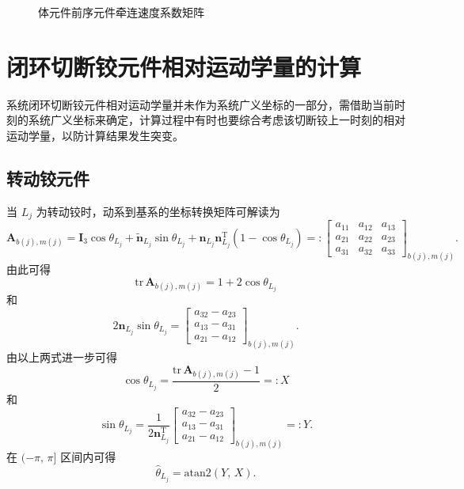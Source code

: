 \begin{figure}[htbp]
  \centering
  \caption{体元件前序元件牵连速度系数矩阵}
  \label{fig:10.6}
\end{figure}

\section{闭环切断铰元件相对运动学量的计算}

系统闭环切断铰元件相对运动学量并未作为系统广义坐标的一部分，需借助当前时刻的系统广义坐标来确定，计算过程中有时也要综合考虑该切断铰上一时刻的相对运动学量，以防计算结果发生突变。

\subsection{转动铰元件}

当 $L_j$ 为转动铰时，动系到基系的坐标转换矩阵可解读为
\begin{equation}\label{eq:10.42}
  \boldsymbol{A}_{b(j),m(j)} = \boldsymbol{I}_3 \cos\theta_{L_j} + \tilde{\boldsymbol{n}}_{L_j} \sin\theta_{L_j} + \boldsymbol{n}_{L_j} \boldsymbol{n}_{L_j}^{\mathrm{T}} (1 - \cos\theta_{L_j})
  =: \begin{bmatrix} a_{11} & a_{12} & a_{13} \\ a_{21} & a_{22} & a_{23} \\ a_{31} & a_{32} & a_{33} \end{bmatrix}_{b(j),m(j)}.
\end{equation}
由此可得
\begin{equation}\label{eq:10.43}
  \mathrm{tr}\,\boldsymbol{A}_{b(j),m(j)} = 1 + 2\cos\theta_{L_j}
\end{equation}
和
\begin{equation}\label{eq:10.44}
  2 \boldsymbol{n}_{L_j} \sin\theta_{L_j} = \begin{bmatrix} a_{32} - a_{23} \\ a_{13} - a_{31} \\ a_{21} - a_{12} \end{bmatrix}_{b(j),m(j)}.
\end{equation}
由以上两式进一步可得
\begin{equation}\label{eq:10.45}
  \cos\theta_{L_j} = \frac{\mathrm{tr}\,\boldsymbol{A}_{b(j),m(j)} - 1}{2} =: X
\end{equation}
和
\begin{equation}\label{eq:10.46}
  \sin\theta_{L_j} = \frac{1}{2\boldsymbol{n}_{L_j}^{\mathrm{T}}} \begin{bmatrix} a_{32} - a_{23} \\ a_{13} - a_{31} \\ a_{21} - a_{12} \end{bmatrix}_{b(j),m(j)} =: Y.
\end{equation}
在 $(-\pi,\,\pi]$ 区间内可得
\begin{equation}\label{eq:10.47}
  \hat{\theta}_{L_j} = \mathrm{atan2}(Y,\, X).
\end{equation}

